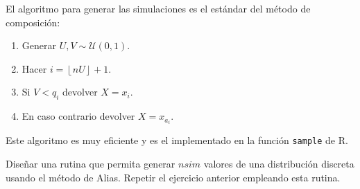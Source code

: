\documentclass[
]{book}
\theoremstyle{break}
\theoremstyle{definition}
\theoremstyle{definition}
\theoremstyle{definition}
\theoremstyle{remark}
\let\BeginKnitrBlock\begin \let\EndKnitrBlock\end
\begin{document}
El algoritmo para generar las simulaciones es el estándar del método de composición:

\begin{enumerate}
\def\labelenumi{\arabic{enumi}.}
\item
  Generar \(U,V\sim \mathcal{U}\left( 0,1\right)\).
\item
  Hacer \(i=\left\lfloor nU\right\rfloor +1\).
\item
  Si \(V<q_{i}\) devolver \(X=x_{i}\).
\item
  En caso contrario devolver \(X=x_{a_{i}}\).
\end{enumerate}

Este algoritmo es muy eficiente y es el implementado en la función \texttt{sample} de R.

\BeginKnitrBlock{exercise}
\protect\hypertarget{exr:unnamed-chunk-24}{}{\label{exr:unnamed-chunk-24} }
\EndKnitrBlock{exercise}

Diseñar una rutina que permita generar \(nsim\) valores de una
distribución discreta usando el método de Alias.
Repetir el ejercicio anterior empleando esta rutina.
\end{document}
